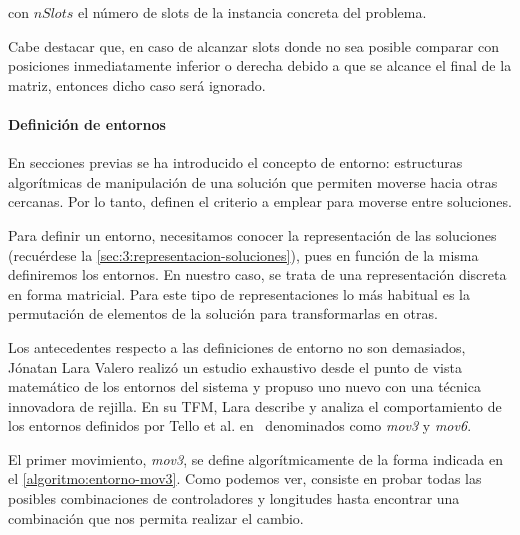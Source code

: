con $nSlots$ el número de slots de la instancia concreta del problema. 

Cabe destacar que, en caso de alcanzar slots
donde no sea posible comparar con posiciones inmediatamente inferior o derecha debido a que se alcance el final de la matriz, entonces dicho caso será ignorado.

\paragraph{Definición de entornos} \label{paragraph:entornos}
En secciones previas se ha introducido el concepto de entorno: estructuras algorítmicas de manipulación de una solución que permiten moverse hacia otras cercanas. Por lo tanto, definen el criterio a emplear para moverse entre soluciones.

Para definir un entorno, necesitamos conocer la representación de las soluciones (recuérdese la \autoref{sec:3:representacion-soluciones}), pues en función de la misma definiremos los entornos. En nuestro caso, se trata de una representación discreta en forma matricial. Para este tipo de representaciones lo más habitual es la permutación de elementos de la solución para transformarlas en otras.

Los antecedentes respecto a las definiciones de entorno no son demasiados, Jónatan Lara Valero realizó un estudio exhaustivo desde el punto de vista matemático de los entornos del sistema \legacy{} y propuso uno nuevo con una técnica innovadora de rejilla. En su TFM, Lara describe y analiza el comportamiento de los entornos definidos por Tello et al. en~\cite{articulo1} denominados como \textit{mov3} y \textit{mov6}.

El primer movimiento, \textit{mov3}, se define algorítmicamente de la forma indicada en el \autoref{algoritmo:entorno-mov3}. Como podemos ver, consiste en probar todas las posibles combinaciones de controladores y longitudes hasta encontrar una combinación que nos permita realizar el cambio.


